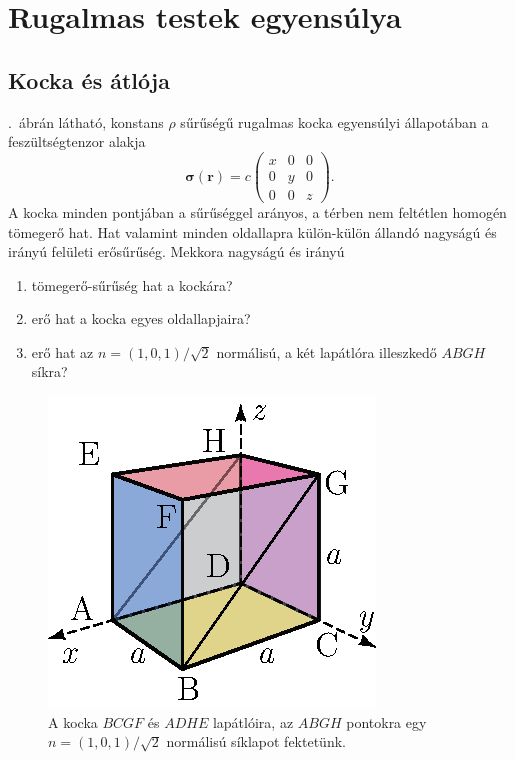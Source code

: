 \documentclass[12pt,a4paper]{scrartcl}
\let\mathbf\bm
\begin{document}
\section{Rugalmas testek egyensúlya}
\subsection{Kocka és átlója}
.\ ábrán látható, konstans $\rho$ sűrűségű rugalmas kocka egyensúlyi állapotában a feszültségtenzor alakja 
\[{\mathbf{\sigma }}\left( {\mathbf{r}} \right) = c \left( {\begin{array}{*{20}{c}}
  {{x}}&0&0 \\ 
  0&{{y}}&0 \\ 
  0&0&{{z}} 
\end{array}} \right).\]
A kocka minden pontjában a sűrűséggel arányos, a térben nem feltétlen homogén tömegerő hat. Hat valamint minden oldallapra külön-külön állandó nagyságú és irányú felületi erősűrűség. Mekkora nagyságú és irányú
\begin{enumerate}
\item tömegerő-sűrűség hat a kockára?
\item erő hat a kocka egyes oldallapjaira?
\item erő hat az $n = \left( {1,0,1} \right)/\sqrt 2 $ normálisú, a két lapátlóra illeszkedő $ABGH$ síkra?
\end{enumerate}
\begin{figure}[htb] 
\centering    
\includegraphics[scale=1]{figs/kocka_atloval.eps}
\caption{A kocka $BCGF$ és $ADHE$ lapátlóira, az $ABGH$ pontokra egy $n = \left( {1,0,1} \right)/\sqrt 2 $ normálisú síklapot fektetünk. }
\label{fig:kocka_atloval}
\end{figure}
\FloatBarrier
\end{document}
